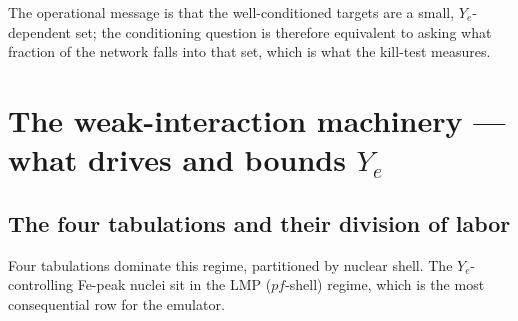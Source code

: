 \documentclass[11pt]{article}
\begin{document}
\noindent The operational message is that the well-conditioned targets are a small, $Y_e$-dependent set; the conditioning question is therefore equivalent to asking what fraction of the network falls into that set, which is what the kill-test measures.

\section{The weak-interaction machinery --- what drives and bounds \texorpdfstring{$Y_e$}{Ye}}

\subsection{The four tabulations and their division of labor}

Four tabulations dominate this regime, partitioned by nuclear shell. The $Y_e$-controlling Fe-peak nuclei sit in the LMP ($pf$-shell) regime, which is the most consequential row for the emulator.
\end{document}
